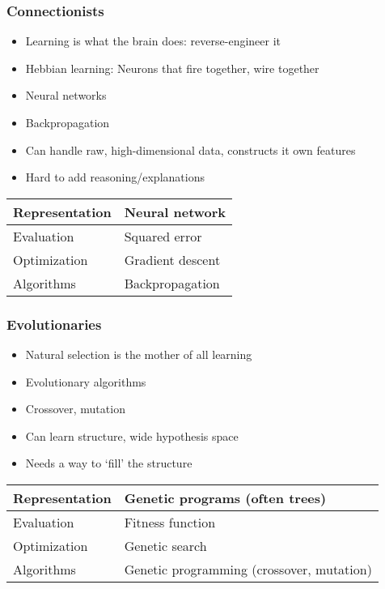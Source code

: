 \documentclass[UTF8,11pt,colorlinks,compress,openany]{beamer}%
\begin{document}
\begin{frame}\frametitle{Connectionists}
\begin{itemize}
	\item Learning is what the brain does: reverse-engineer it
	\item Hebbian learning: Neurons that fire together, wire together
	\item Neural networks
	\item Backpropagation
	\item Can handle raw, high-dimensional data, constructs it own features
	\item Hard to add reasoning/explanations
\end{itemize}
\begin{table}
\begin{tabu}{l|l}
\hline
Representation &Neural network\\
\hline
Evaluation &Squared error\\
\hline
Optimization &Gradient descent\\
\hline
Algorithms &Backpropagation\\
\hline
\end{tabu}
\end{table}
\end{frame}

\begin{frame}\frametitle{Evolutionaries}
\begin{itemize}
	\item Natural selection is the mother of all learning
	\item Evolutionary algorithms
	\item Crossover, mutation
	\item Can learn structure, wide hypothesis space
	\item Needs a way to `fill' the structure
\end{itemize}
\begin{table}
\begin{tabu}{l|l}
\hline
Representation &Genetic programs (often trees)\\
\hline
Evaluation &Fitness function\\
\hline
Optimization &Genetic search\\
\hline
Algorithms &Genetic programming (crossover, mutation)\\
\hline
\end{tabu}
\end{table}
\end{frame}
\end{document}
